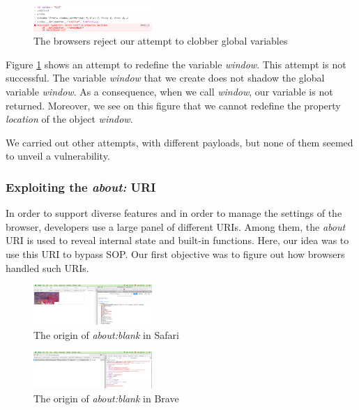 \documentclass[journal]{IEEEtran}
\begin{document}
\begin{figure}[h]
\centering
\includegraphics[width=0.4\textwidth]{images/clobberingAttempt.png}
\caption{The browsers reject our attempt to clobber global variables}
\label{fig:clobbering}
\end{figure}

Figure \ref{fig:clobbering} shows an attempt to redefine the variable \emph{window}. This attempt is not successful. The variable \emph{window} that we create does not shadow the global variable \emph{window}. As a consequence, when we call \emph{window}, our variable is not returned. Moreover, we see on this figure that we cannot redefine the property \emph{location} of the object \emph{window}. 

\medskip

We carried out other attempts, with different payloads, but none of them seemed to unveil a vulnerability.

\subsubsection*{Exploiting the \emph{about:} URI}

In order to support diverse features and in order to manage the settings of the browser, developers use a large panel of different URIs. Among them, the \emph{about} URI is used to reveal internal state and built-in functions. Here, our idea was to use this URI to bypass SOP. Our first objective was to figure out how browsers handled such URIs. 

\begin{figure}[h]
\centering
\includegraphics[width=0.4\textwidth]{images/AboutBlankSafari.png}
\caption{The origin of \emph{about:blank} in Safari}
\label{fig:aboutBlankSafari}
\end{figure}

\begin{figure}[h]
\centering
\includegraphics[width=0.4\textwidth]{images/AboutBlankBrave.png}
\caption{The origin of \emph{about:blank} in Brave}
\label{fig:aboutBlankBrave}
\end{figure}
\end{document}

